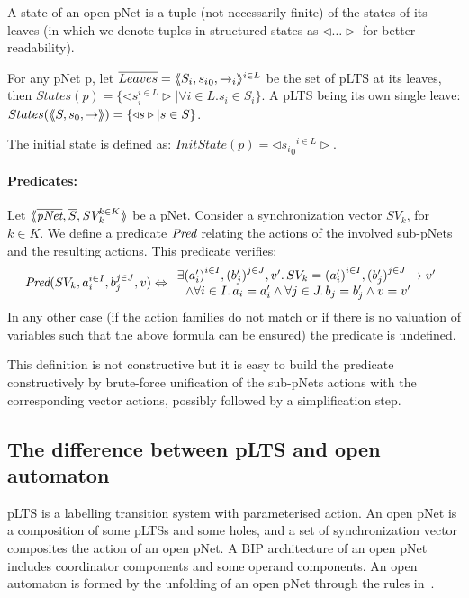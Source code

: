 \documentclass[runningheads,a4paper]{llncs}
\begin{document}
\begin{definition}\label{def-states}
  A state of an open pNet is a tuple (not necessarily finite) of the
  states of its leaves (in which we denote tuples
  in structured states as $\triangleleft\ldots\triangleright$ for better readability).

  For any pNet p, let $\overline{Leaves} = \langle\hspace{-0.58ex}\langle S_i,{s_i}_0, \to_i\rangle\hspace{-0.58ex}\rangle^{i \in L}$ be the set of pLTS at its leaves,
  then $States(p) = \{\triangleleft s_i^{i\in L}
  \triangleright| \forall i\in L. s_i \in S_i\}$.
A pLTS being its own single leave:
  $States(\langle\hspace{-0.58ex}\langle S,s_0, \to\rangle\hspace{-0.58ex}\rangle) = \{\triangleleft s \triangleright| s \in S\}$.

The initial state is defined as:
$InitState(p) = \triangleleft {{s_i}_0}^{i\in L}  \triangleright$.
\end{definition}


\paragraph{Predicates:}
Let $\mylangle\overline{\pNet},\overline{S},\symb{SV}_k^{k\in K} \myrangle$
be a pNet. Consider a synchronization vector $SV_k$, for $k\in K$. We define a
predicate $\Pred$ relating the actions of the involved sub-pNets and the resulting actions. This predicate verifies:
\[\Pred(SV_k, a_i^{i\in I}, b_j^{j\in J}, v)\Leftrightarrow
\begin{array}{l}
\exists {(a'_i)}^{i\in I},
{(b'_j)}^{j\in J},v'.\, SV_k={(a'_i)}^{i\in I}, {(b'_j)}^{j\in J}\rightarrow v'
\\~~\land
\forall i\in I.\, a_i=a'_i\land \forall j \in J.\, b_j=b'_j \land v=v'
\end{array}\]
In any other case (if the action families do not match or if there is no valuation of variables such that the above formula can be ensured) the predicate is undefined.

This definition is not constructive but it is easy to build the predicate constructively by brute-force unification of the sub-pNets actions with the corresponding vector actions, possibly followed by a simplification step.

 

 \subsection{The difference between pLTS and open automaton}
 pLTS is a labelling transition system with parameterised action. An open pNet is a composition of some pLTSs and some holes, and a set of synchronization vector composites the action of an open pNet. A BIP architecture of an open pNet includes coordinator components and some operand components. An open automaton is formed by the unfolding of an open pNet through the rules in~\cite{xudong2017smt}. 
 
\end{document}
